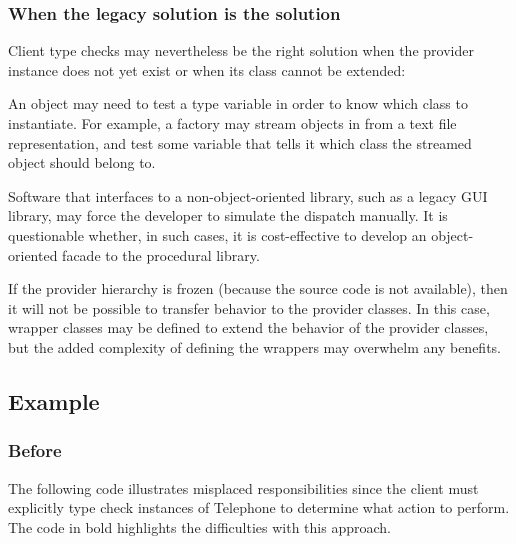 \documentclass[a4paper,10pt,twoside]{book}
\begin{document}
\subsubsection*{When the legacy solution is the solution}

Client type checks may nevertheless be the right solution when the provider instance does not yet exist or when its class cannot be extended:

\begin{bulletlist}
\item An  object may need to test a type variable in order to know which class to instantiate. For example, a factory may stream objects in from a text file representation, and test some variable that tells it which class the streamed object should belong to.

\item Software that interfaces to a non-object-oriented library, such as a legacy GUI library, may force the developer to simulate the dispatch manually. It is questionable whether, in such cases, it is cost-effective to develop an object-oriented facade to the procedural library.

\item If the provider hierarchy is frozen (\eg because the source code is not available), then it will not be possible to transfer behavior to the provider classes. In this case, wrapper classes may be defined to extend the behavior of the provider classes, but the added complexity of defining the wrappers may overwhelm any benefits.
\end{bulletlist}

\subsection*{Example}

\subsubsection*{Before}

The following  code illustrates misplaced responsibilities since the client must explicitly type check instances of Telephone to determine what action to perform. The code in bold highlights the difficulties with this approach.

\end{document}
